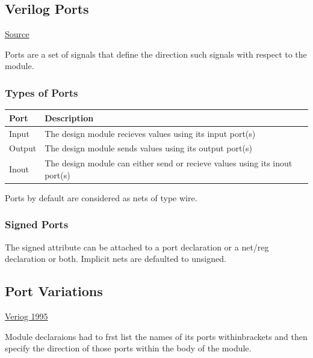 \documentclass{article}
\begin{document}
	\subsection{Verilog Ports}
	\href{https://www.chipverify.com/verilog/verilog-ports}{Source}

	Ports are a set of signals that define the direction such signals with respect to the module.

	\subsubsection{Types of Ports}

	\begin{tabular}{|l|p{10cm}|}
		\hline
		{\bf Port} & {\bf Description} \\
		\hline
		Input & The design module recieves values using its input port(s) \\
		\hline
		Output & The design module sends values using its output port(s) \\
		\hline
		Inout & The design module can either send or recieve values using its inout port(s) \\
		\hline
	\end{tabular}

	Ports by default are considered as nets of type wire.
	\subsubsection{Signed Ports}
	The signed attribute can be attached to a port declaration or a net/reg declaration or both. Implicit nets are defaulted to unsigned.

	\subsection{Port Variations}

	\underline{Veriog 1995} \newline

	Module declaraions had to frst list the names of its ports withinbrackets and then specify the direction of those ports within the body of the module.
\end{document}

